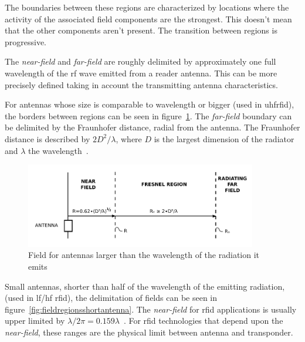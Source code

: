 The boundaries between these regions are characterized by locations where the activity of the associated field components are the strongest. This doesn't mean that the other components aren't present. The transition between regions is progressive.

The \emph{near-field} and \emph{far-field} are roughly delimited by approximately one full wavelength of the \ac{rf} wave emitted from a reader antenna.
This can be more precisely defined taking in account the transmitting antenna characteristics.

For antennas whose size is comparable to wavelength or bigger (used in \ac{uhfrfid}), the borders between regions can be seen in figure~\ref{fig:fieldregionsbigantenna}. The \emph{far-field} boundary can be delimited by the Fraunhofer distance, radial from the antenna. The Fraunhofer distance is described by $2D^2 / \lambda$, where $D$ is the largest dimension of the radiator and $\lambda$ the wavelength~\cite{balanisAntennaTheoryAnalysis2005}.

\begin{figure}[!ht]
    \centering
    \includegraphics[width=0.9\textwidth]{./figs/02-state-of-the-art/FarNearFields-USP-4998112.pdf}
    \caption{Field for antennas larger than the wavelength of the radiation it emits~\cite{zerodamageFarFieldsVectorized1991}} 
    \label{fig:fieldregionsbigantenna}
\end{figure}

Small antennas, shorter than half of the wavelength of the emitting radiation, (used in \ac{lf}/\ac{hf} \ac{rfid}), the delimitation of fields can be seen in figure~\ref{fig:fieldregionsshortantenna}. The \emph{near-field} for \ac{rfid} applications is usually upper limited by $\lambda / 2\pi = 0.159\lambda$~\cite{nikitinOverviewFieldUHF2007a}. 
For \ac{rfid} technologies that depend upon the \emph{near-field}, these ranges are the physical limit between antenna and transponder.

